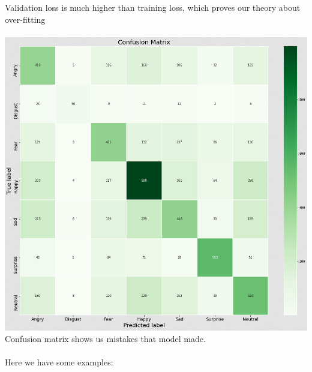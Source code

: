 Validation loss is much higher than training loss, which proves our theory about over-fitting\\
\\
\includegraphics[scale=0.60]{images/modelOne/matrixOne.png}\\
Confusion matrix shows us mistakes that model made.\\
\\
Here we have some examples:
